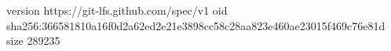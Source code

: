 version https://git-lfs.github.com/spec/v1
oid sha256:366581810a16f0d2a62ed2e21e3898cc58c28aa823e460ae23015f469c76e81d
size 289235
